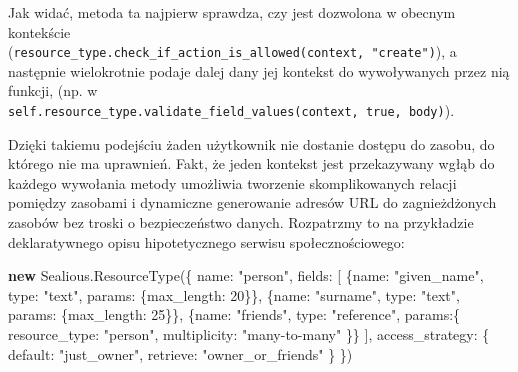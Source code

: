 \documentclass[12pt,polish,a4paper,]{report}
\newenvironment{Shaded}{}{}
\newcommand{\KeywordTok}[1]{\textcolor[rgb]{0.00,0.44,0.13}{\textbf{{#1}}}}
\newcommand{\DataTypeTok}[1]{\textcolor[rgb]{0.56,0.13,0.00}{{#1}}}
\newcommand{\DecValTok}[1]{\textcolor[rgb]{0.25,0.63,0.44}{{#1}}}
\newcommand{\StringTok}[1]{\textcolor[rgb]{0.25,0.44,0.63}{{#1}}}
\newcommand{\VariableTok}[1]{\textcolor[rgb]{0.10,0.09,0.49}{{#1}}}
\newcommand{\OperatorTok}[1]{\textcolor[rgb]{0.40,0.40,0.40}{{#1}}}
\newcommand{\AttributeTok}[1]{\textcolor[rgb]{0.49,0.56,0.16}{{#1}}}
\newcommand{\NormalTok}[1]{{#1}}
\begin{document}
\begin{enumerate}
  Jak widać, metoda ta najpierw sprawdza, czy jest dozwolona w obecnym
  kontekście
  (\texttt{resource\_type.check\_if\_action\_is\_allowed(context,\ "create")}),
  a następnie wielokrotnie podaje dalej dany jej kontekst do
  wywoływanych przez nią funkcji, (np. w
  \texttt{self.resource\_type.validate\_field\_values(context,\ true,\ body)}).

  Dzięki takiemu podejściu żaden użytkownik nie dostanie dostępu do
  zasobu, do którego nie ma uprawnień. Fakt, że jeden kontekst jest
  przekazywany wgłąb do każdego wywołania metody umożliwia tworzenie
  skomplikowanych relacji pomiędzy zasobami i dynamiczne generowanie
  adresów URL do zagnieżdżonych zasobów bez troski o bezpieczeństwo
  danych. Rozpatrzmy to na przykładzie deklaratywnego opisu
  hipotetycznego serwisu społecznościowego:

\begin{Shaded}
\begin{Highlighting}[]
\KeywordTok{new} \VariableTok{Sealious}\NormalTok{.}\AttributeTok{ResourceType}\NormalTok{(}\OperatorTok{\{}
    \DataTypeTok{name}\OperatorTok{:} \StringTok{"person"}\OperatorTok{,}
    \DataTypeTok{fields}\OperatorTok{:} \NormalTok{[}
        \OperatorTok{\{}\DataTypeTok{name}\OperatorTok{:} \StringTok{"given_name"}\OperatorTok{,} \DataTypeTok{type}\OperatorTok{:} \StringTok{"text"}\OperatorTok{,} \DataTypeTok{params}\OperatorTok{:} \OperatorTok{\{}\DataTypeTok{max_length}\OperatorTok{:} \DecValTok{20}\OperatorTok{\}\},}
        \OperatorTok{\{}\DataTypeTok{name}\OperatorTok{:} \StringTok{"surname"}\OperatorTok{,} \DataTypeTok{type}\OperatorTok{:} \StringTok{"text"}\OperatorTok{,} \DataTypeTok{params}\OperatorTok{:} \OperatorTok{\{}\DataTypeTok{max_length}\OperatorTok{:} \DecValTok{25}\OperatorTok{\}\},}
        \OperatorTok{\{}\DataTypeTok{name}\OperatorTok{:} \StringTok{"friends"}\OperatorTok{,} \DataTypeTok{type}\OperatorTok{:} \StringTok{"reference"}\OperatorTok{,} \DataTypeTok{params}\OperatorTok{:\{}
            \DataTypeTok{resource_type}\OperatorTok{:} \StringTok{"person"}\OperatorTok{,}
            \DataTypeTok{multiplicity}\OperatorTok{:} \StringTok{"many-to-many"}
        \OperatorTok{\}\}}
    \NormalTok{]}\OperatorTok{,}
    \DataTypeTok{access_strategy}\OperatorTok{:} \OperatorTok{\{}
        \DataTypeTok{default}\OperatorTok{:} \StringTok{"just_owner"}\OperatorTok{,}
        \DataTypeTok{retrieve}\OperatorTok{:} \StringTok{"owner_or_friends"}
    \OperatorTok{\}}
\OperatorTok{\}}\NormalTok{)}


\end{Highlighting}
\end{Shaded}
\end{enumerate}
\end{document}

